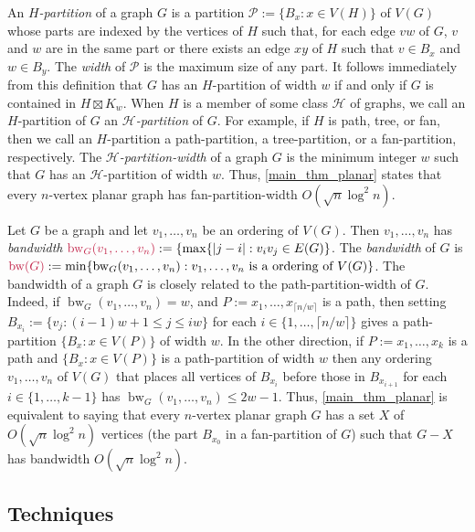 \documentclass{patmorin}
\makeatletter
\renewcommand{\le}{\leqslant}
\newcommand{\david}[1]{{\color{orange} David: #1}}
\newcommand{\defin}[1]{\emph{\textcolor{brightmaroon}{#1}}}
\def\mathcolor#1#{\@mathcolor{#1}}
\def\@mathcolor#1#2#3{%
  \protect\leavevmode
  \begingroup
    \color#1{#2}#3%
  \endgroup
}
\newcommand{\mathdefin}[1]{\mathcolor{brightmaroon}{#1}}
\DeclareMathOperator{\bw}{bw}
\makeatother
\begin{document}
An \defin{$H$-partition} of a graph $G$ is a partition $\mathcal{P}:=\{B_x: x\in V(H)\}$ of $V(G)$ whose parts are indexed by the vertices of $H$ such that, for each edge $vw$ of $G$, $v$ and $w$ are in the same part or there exists an edge $xy$ of $H$ such that $v\in B_x$ and $w\in B_y$.  The \defin{width} of $\mathcal{P}$ is the maximum size of any part.  It follows immediately from this definition that $G$ has an $H$-partition of width $w$ if and only if $G$ is contained in $H\boxtimes K_w$. When $H$ is a member of some class $\mathcal{H}$ of graphs, we call an $H$-partition of $G$ an \defin{$\mathcal{H}$-partition} of $G$.  For example, if $H$ is path, tree, or fan, then we call an $H$-partition a path-partition, a tree-partition, or a fan-partition, respectively.  The \defin{$\mathcal{H}$-partition-width}  of a graph $G$ is the minimum integer $w$ such that $G$ has an $\mathcal{H}$-partition of width $w$. Thus, \cref{main_thm_planar} states that every $n$-vertex planar graph has fan-partition-width $O(\sqrt{n}\log^2 n)$.


Let $G$ be a graph and let $v_1,\ldots,v_n$ be an ordering of $V(G)$.  Then $v_1,\ldots,v_n$ has \defin{bandwidth} $\mathdefin{\bw_G(v_1,\ldots,v_n)}:=\{\max\{|j-i|: v_iv_j\in E(G)\}$.  The \defin{bandwidth} of $G$ is $\mathdefin{\bw(G)}:=\min\{\bw_G(v_1,\ldots,v_n):\text{$v_1,\ldots,v_n$ is a ordering of $V(G)$}\}$. The bandwidth of a graph $G$ is closely related to the path-partition-width of $G$.  Indeed, if $\bw_G(v_1,\ldots,v_n)=w$, and $P:=x_1,\ldots,x_{\lceil n/w\rceil}$ is a path, then setting $B_{x_i}:=\{v_j: (i-1)w+1 \le j \le iw\}$ for each $i\in\{1,\ldots,\lceil n/w\rceil\}$ gives a path-partition $\{B_{x}:x\in V(P)\}$ of width $w$.  In the other direction, if $P:=x_1,\ldots,x_k$ is a path and  $\{B_x:x\in V(P)\}$ is a path-partition of width $w$ then any ordering $v_1,\ldots,v_n$ of $V(G)$ that places all vertices of $B_{x_i}$ before those in $B_{x_{i+1}}$ for each $i\in\{1,\ldots,k-1\}$ has $\bw_G(v_1,\ldots,v_n)\le 2w-1$.  Thus, \cref{main_thm_planar} is equivalent to saying that every $n$-vertex planar graph $G$ has a set $X$ of  $O(\sqrt{n}\log^2 n)$ vertices (the part $B_{x_0}$ in a fan-partition of $G$) such that $G-X$ has bandwidth $O(\sqrt{n}\log^2 n)$.


\subsection{Techniques}
\end{document}
